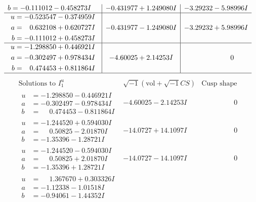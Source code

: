 \documentclass[1p]{elsarticle_modified}
\theoremstyle{definition}
\newcommand{\I}{\sqrt{-1}}
\begin{document}
$$\begin{array}{c|c|c}
\begin{aligned}
b &= -0.111012 - 0.458273 I\end{aligned}
 & -0.431977 + 1.249080 I & -3.29232 - 5.98996 I \\ \hline\begin{aligned}
u &= -0.523547 - 0.374959 I \\
a &= \phantom{-}0.632108 + 0.620727 I \\
b &= -0.111012 + 0.458273 I\end{aligned}
 & -0.431977 - 1.249080 I & -3.29232 + 5.98996 I \\ \hline\begin{aligned}
u &= -1.298850 + 0.446921 I \\
a &= -0.302497 + 0.978434 I \\
b &= \phantom{-}0.474453 + 0.811864 I\end{aligned}
 & -4.60025 + 2.14253 I & \phantom{-0.000000 } 0\\
 \hline 
 \end{array}$$\newpage$$\begin{array}{c|c|c}  
\text{Solutions to }I^u_{1}& \I (\text{vol} + \sqrt{-1}CS) & \text{Cusp shape}\\
 \hline 
\begin{aligned}
u &= -1.298850 - 0.446921 I \\
a &= -0.302497 - 0.978434 I \\
b &= \phantom{-}0.474453 - 0.811864 I\end{aligned}
 & -4.60025 - 2.14253 I & \phantom{-0.000000 } 0 \\ \hline\begin{aligned}
u &= -1.244520 + 0.594030 I \\
a &= \phantom{-}0.50825 - 2.01870 I \\
b &= -1.35396 - 1.28721 I\end{aligned}
 & -14.0727 + 14.1097 I & \phantom{-0.000000 } 0 \\ \hline\begin{aligned}
u &= -1.244520 - 0.594030 I \\
a &= \phantom{-}0.50825 + 2.01870 I \\
b &= -1.35396 + 1.28721 I\end{aligned}
 & -14.0727 - 14.1097 I & \phantom{-0.000000 } 0 \\ \hline\begin{aligned}
u &= \phantom{-}1.367670 + 0.303326 I \\
a &= -1.12338 - 1.01518 I \\
b &= -0.94061 - 1.44352 I\end{aligned}

\end{array}$$
\end{document}
